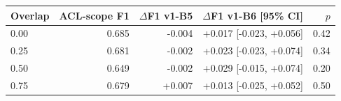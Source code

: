 \begin{tabular}{@{}l r r r r@{}}
\toprule
Overlap & ACL-scope F1 & $\Delta$F1 v1-B5 & $\Delta$F1 v1-B6 [95\% CI] & $p$ \\
\midrule
0.00 & 0.685 & -0.004 & +0.017 [-0.023, +0.056] & 0.42 \\
0.25 & 0.681 & -0.002 & +0.023 [-0.023, +0.074] & 0.34 \\
0.50 & 0.649 & -0.002 & +0.029 [-0.015, +0.074] & 0.20 \\
0.75 & 0.679 & +0.007 & +0.013 [-0.025, +0.052] & 0.50 \\
\bottomrule
\end{tabular}
